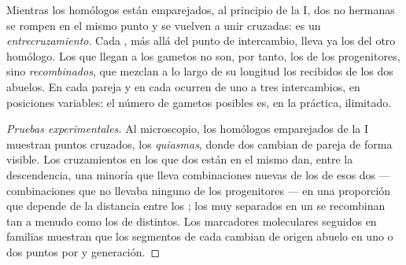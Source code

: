 \begin{proposition}[El entrecruzamiento]\label{prop:g12:meiosis-genetic-shuffling:crossingover}
Mientras los homólogos están emparejados, al principio de la  I,
dos  no hermanas se rompen en el mismo punto y se vuelven a
unir cruzadas: es un
\emph{entrecruzamiento}. Cada , más
allá del punto de intercambio, lleva ya los  del otro homólogo.
Los  que llegan a los gametos no son, por tanto, los
 de los progenitores, sino 
\emph{recombinados}, que mezclan a lo largo de su longitud los 
recibidos de los dos abuelos. En cada pareja y en cada  ocurren
de uno a tres intercambios, en posiciones variables: el número de
gametos posibles es, en la práctica, ilimitado.
\end{proposition}
\begin{proof}[Pruebas experimentales]
Al microscopio, los homólogos emparejados de la  I muestran
puntos cruzados, los \emph{quiasmas}, donde dos  cambian de
pareja de forma visible. Los cruzamientos en los que dos  están en
el mismo  dan, entre la descendencia, una minoría que lleva
combinaciones nuevas de los  de esos dos  --- combinaciones
que no llevaba ninguno de los progenitores --- en una proporción que
depende de la distancia entre los ; los  muy separados en un
 se recombinan tan a menudo como los  de 
distintos. Los marcadores moleculares seguidos en familias muestran que
los segmentos de cada  cambian de origen abuelo en uno o dos
puntos por  y generación.
\end{proof}

